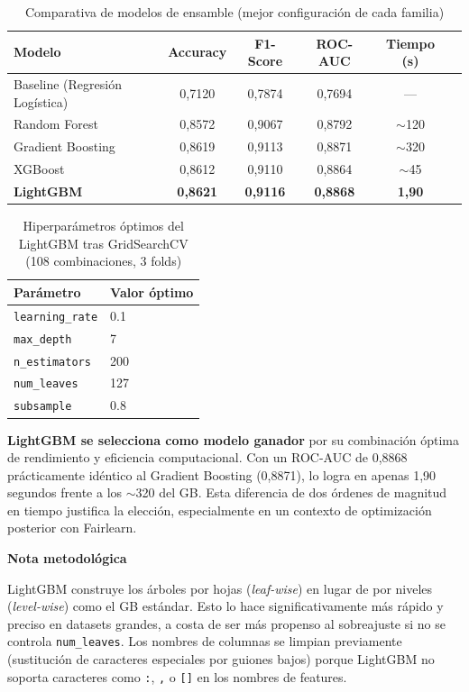 \documentclass[11pt,a4paper]{article}
\newcommand{\discusiontitle}{%
  {\small\bfseries\color{blue!60!black}Nota metodológica}\par\smallskip
}
\begin{document}
\begin{table}[ht]
\centering
\caption{Comparativa de modelos de ensamble (mejor configuración de cada familia)}
\label{tab:comparativa_modelos}
\small
\begin{tabular}{@{}lccccc@{}}
\toprule
\textbf{Modelo} & \textbf{Accuracy} & \textbf{F1-Score} & \textbf{ROC-AUC} & \textbf{Tiempo (s)} \\ \midrule
Baseline (Regresión Logística) & 0{,}7120 & 0{,}7874 & 0{,}7694 & --- \\
Random Forest                  & 0{,}8572 & 0{,}9067 & 0{,}8792 & $\sim$120 \\
Gradient Boosting              & 0{,}8619 & 0{,}9113 & 0{,}8871 & $\sim$320 \\
XGBoost                        & 0{,}8612 & 0{,}9110 & 0{,}8864 & $\sim$45  \\
\textbf{LightGBM}              & \textbf{0{,}8621} & \textbf{0{,}9116} & \textbf{0{,}8868} & \textbf{1{,}90} \\
\bottomrule
\end{tabular}
\end{table}

\begin{table}[ht]
\centering
\caption{Hiperparámetros óptimos del LightGBM tras GridSearchCV (108 combinaciones, 3 folds)}
\label{tab:lgbm_params}
\small
\begin{tabular}{@{}ll@{}}
\toprule
\textbf{Parámetro} & \textbf{Valor óptimo} \\ \midrule
\texttt{learning\_rate} & 0.1 \\
\texttt{max\_depth}     & 7 \\
\texttt{n\_estimators}  & 200 \\
\texttt{num\_leaves}    & 127 \\
\texttt{subsample}      & 0.8 \\
\bottomrule
\end{tabular}
\end{table}

\textbf{LightGBM se selecciona como modelo ganador} por su combinación óptima de rendimiento
y eficiencia computacional. Con un ROC-AUC de 0{,}8868 prácticamente idéntico al Gradient
Boosting (0{,}8871), lo logra en apenas 1{,}90 segundos frente a los $\sim$320 del GB. Esta
diferencia de dos órdenes de magnitud en tiempo justifica la elección, especialmente en un contexto
de optimización posterior con Fairlearn.

\begin{discusion}
\discusiontitle
LightGBM construye los árboles por hojas (\textit{leaf-wise}) en lugar de por niveles
(\textit{level-wise}) como el GB estándar. Esto lo hace significativamente más rápido y preciso
en datasets grandes, a costa de ser más propenso al sobreajuste si no se controla \texttt{num\_leaves}.
Los nombres de columnas se limpian previamente (sustitución de caracteres especiales por guiones
bajos) porque LightGBM no soporta caracteres como \texttt{:}, \texttt{,} o \texttt{[]} en los
nombres de features.
\end{discusion}
\end{document}
